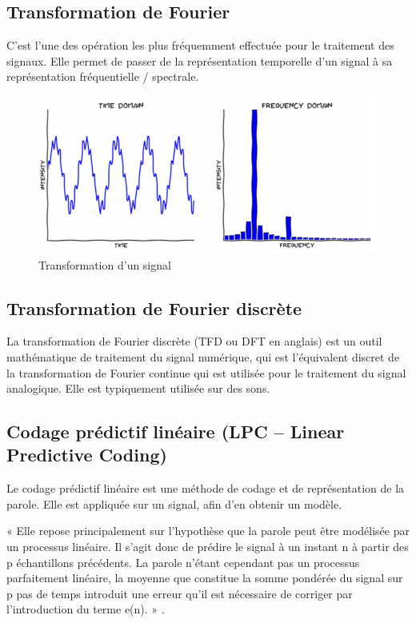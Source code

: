 \documentclass[a4paper, 12pt]{book}
\begin{document}
\subsection{Transformation de Fourier}

C’est l’une des opération les plus fréquemment effectuée pour le traitement des signaux. Elle permet de passer de la représentation temporelle d’un signal à sa représentation fréquentielle / spectrale.

\begin{figure}[htbp]
  \centering
  \includegraphics[width=1\linewidth]{fig/fourier.png}
  \caption{Transformation d’un signal}
\end{figure}

\subsection{Transformation de Fourier discrète}

La transformation de Fourier discrète (TFD ou DFT en anglais) est un outil mathématique de traitement du signal numérique, qui est l'équivalent discret de la transformation de Fourier continue qui est utilisée pour le traitement du signal analogique. Elle est typiquement utilisée sur des sons.

\subsection{Codage prédictif linéaire (LPC – Linear Predictive Coding)}

Le codage prédictif linéaire est une méthode de codage et de représentation de la parole. Elle est appliquée sur un signal, afin d’en obtenir un modèle.

« Elle repose principalement sur l’hypothèse que la parole peut être modélisée par un processus linéaire. Il s’agit donc de prédire le signal à un instant n à partir des p échantillons précédents. La parole n’étant cependant pas un processus parfaitement linéaire, la moyenne que constitue la somme pondérée du signal sur p pas de temps introduit une erreur qu’il est nécessaire de corriger par l’introduction du terme e(n). » .
\end{document}
